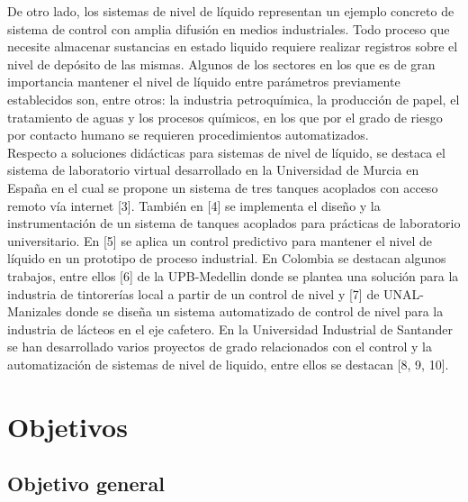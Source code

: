 \documentclass[a4paper,12pt,twoside]{proyectotanquesecci}
\begin{document}
De otro lado, los sistemas de nivel de líquido representan un ejemplo concreto de sistema de control con amplia difusión en medios industriales. Todo proceso que necesite almacenar sustancias en estado liquido requiere realizar registros sobre el nivel de depósito de las mismas. Algunos de los sectores en los que es de gran importancia mantener el nivel de líquido entre parámetros previamente establecidos son, entre otros: la industria petroquímica, la producción de papel, el tratamiento de aguas y los procesos químicos, en los que por el grado de riesgo por contacto humano se requieren procedimientos automatizados. \\

Respecto a soluciones didácticas para sistemas de nivel de líquido, se destaca el sistema de laboratorio virtual desarrollado en la Universidad de Murcia en España en el cual se propone un sistema de tres tanques acoplados con acceso remoto vía internet [3]. También en [4] se implementa el diseño y la instrumentación de un sistema de tanques acoplados para prácticas de laboratorio universitario. En [5] se aplica un control predictivo para mantener el nivel de líquido en un prototipo de proceso industrial. En Colombia se destacan algunos trabajos, entre ellos [6] de la UPB-Medellin donde se plantea una solución para la industria de tintorerías local a partir de un control de nivel y [7] de UNAL-Manizales donde se diseña un sistema automatizado de control de nivel para la industria de lácteos en el eje cafetero. En la Universidad Industrial de Santander se han desarrollado varios proyectos de grado relacionados con el control y la automatización de sistemas de nivel de liquido, entre ellos se destacan [8, 9, 10]. \\






\chapter{Objetivos}

\section{Objetivo general}
\end{document}
